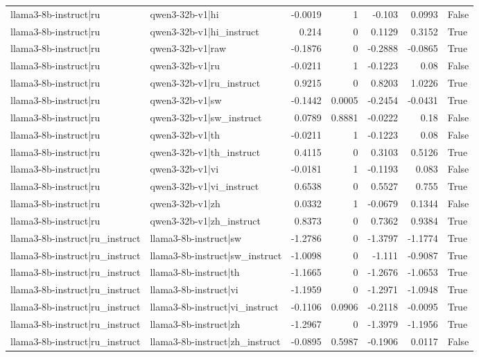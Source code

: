 \begin{table}
\begin{tabular}{l l r r r r l}
llama3-8b-instruct|ru & qwen3-32b-v1|hi & -0.0019 & 1 & -0.103 & 0.0993 & False \\
llama3-8b-instruct|ru & qwen3-32b-v1|hi_instruct & 0.214 & 0 & 0.1129 & 0.3152 & True \\
llama3-8b-instruct|ru & qwen3-32b-v1|raw & -0.1876 & 0 & -0.2888 & -0.0865 & True \\
llama3-8b-instruct|ru & qwen3-32b-v1|ru & -0.0211 & 1 & -0.1223 & 0.08 & False \\
llama3-8b-instruct|ru & qwen3-32b-v1|ru_instruct & 0.9215 & 0 & 0.8203 & 1.0226 & True \\
llama3-8b-instruct|ru & qwen3-32b-v1|sw & -0.1442 & 0.0005 & -0.2454 & -0.0431 & True \\
llama3-8b-instruct|ru & qwen3-32b-v1|sw_instruct & 0.0789 & 0.8881 & -0.0222 & 0.18 & False \\
llama3-8b-instruct|ru & qwen3-32b-v1|th & -0.0211 & 1 & -0.1223 & 0.08 & False \\
llama3-8b-instruct|ru & qwen3-32b-v1|th_instruct & 0.4115 & 0 & 0.3103 & 0.5126 & True \\
llama3-8b-instruct|ru & qwen3-32b-v1|vi & -0.0181 & 1 & -0.1193 & 0.083 & False \\
llama3-8b-instruct|ru & qwen3-32b-v1|vi_instruct & 0.6538 & 0 & 0.5527 & 0.755 & True \\
llama3-8b-instruct|ru & qwen3-32b-v1|zh & 0.0332 & 1 & -0.0679 & 0.1344 & False \\
llama3-8b-instruct|ru & qwen3-32b-v1|zh_instruct & 0.8373 & 0 & 0.7362 & 0.9384 & True \\
llama3-8b-instruct|ru_instruct & llama3-8b-instruct|sw & -1.2786 & 0 & -1.3797 & -1.1774 & True \\
llama3-8b-instruct|ru_instruct & llama3-8b-instruct|sw_instruct & -1.0098 & 0 & -1.111 & -0.9087 & True \\
llama3-8b-instruct|ru_instruct & llama3-8b-instruct|th & -1.1665 & 0 & -1.2676 & -1.0653 & True \\
llama3-8b-instruct|ru_instruct & llama3-8b-instruct|vi & -1.1959 & 0 & -1.2971 & -1.0948 & True \\
llama3-8b-instruct|ru_instruct & llama3-8b-instruct|vi_instruct & -0.1106 & 0.0906 & -0.2118 & -0.0095 & True \\
llama3-8b-instruct|ru_instruct & llama3-8b-instruct|zh & -1.2967 & 0 & -1.3979 & -1.1956 & True \\
llama3-8b-instruct|ru_instruct & llama3-8b-instruct|zh_instruct & -0.0895 & 0.5987 & -0.1906 & 0.0117 & False \\

\end{tabular}
\end{table}
